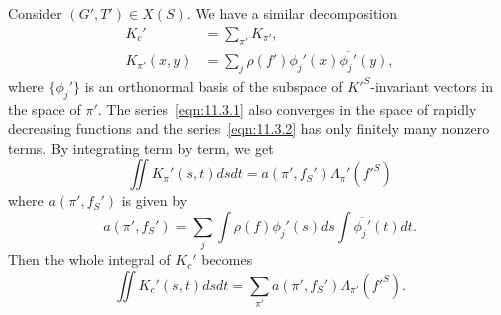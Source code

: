 \subsection{}
Consider $(G', T') \in X(S)$.
We have a similar decomposition
\begin{align}
    K_c' &= \sum_{\pi'} K_{\pi'}, \label{eqn:11.3.1} \\
    K_{\pi'}(x, y) &= \sum_j \rho(f') \phi_j'(x) \overline{\phi_j'}(y), \label{eqn:11.3.2}
\end{align}
where $\{\phi_j'\}$ is an orthonormal basis of the subspace of $K'^S$-invariant vectors in the space of $\pi'$.
The series~\eqref{eqn:11.3.1} also converges in the space of rapidly decreasing functions and the series~\eqref{eqn:11.3.2} has only finitely many nonzero terms.
By integrating term by term, we get
\begin{equation}
    \iint K_\pi'(s, t)dsdt = a(\pi', f_S') \Lambda_\pi'(f'^S)
\end{equation}
where $a(\pi', f_S')$ is given by
\begin{equation}
    a(\pi', f_S') = \sum_j \int \rho(f) \phi_j'(s) ds \int \overline{\phi_j'}(t) dt.
\end{equation}
Then the whole integral of $K_c'$ becomes
\begin{equation*}
    \iint K_c'(s, t) dsdt = \sum_{\pi'}a(\pi', f_S') \Lambda_{\pi'}(f'^S).
\end{equation*}



